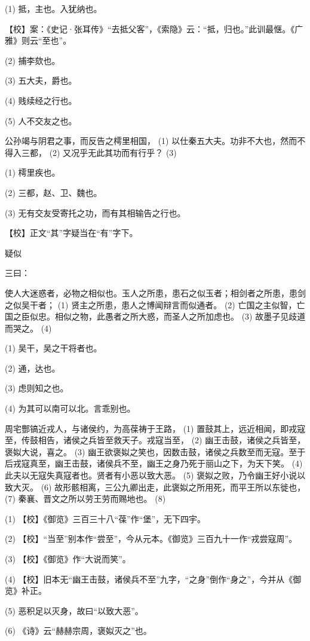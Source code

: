 \documentclass[12pt,UTF8]{ctexbook}
\begin{document}
(1) 抵，主也。入犹纳也。

【校】案：《史记·张耳传》“去抵父客”，《索隐》云：“抵，归也。”此训最惬。《广雅》则云“至也”。

(2) 捕李欬也。

(3) 五大夫，爵也。

(4) 贱续经之行也。

(5) 人不交友之也。

公孙竭与阴君之事，而反告之樗里相国， (1) 以仕秦五大夫。功非不大也，然而不得入三都， (2) 又况乎无此其功而有行乎？ (3)

(1) 樗里疾也。

(2) 三都，赵、卫、魏也。

(3) 无有交友受寄托之功，而有其相输告之行也。

【校】正文“其”字疑当在“有”字下。





疑似


三曰：

使人大迷惑者，必物之相似也。玉人之所患，患石之似玉者；相剑者之所患，患剑之似吴干者； (1) 贤主之所患，患人之博闻辩言而似通者。 (2) 亡国之主似智，亡国之臣似忠。相似之物，此愚者之所大惑，而圣人之所加虑也。 (3) 故墨子见歧道而哭之。 (4)

(1) 吴干，吴之干将者也。

(2) 通，达也。

(3) 虑则知之也。

(4) 为其可以南可以北。言乖别也。

周宅酆镐近戎人，与诸侯约，为高葆祷于王路， (1) 置鼓其上，远近相闻，即戎寇至，传鼓相告，诸侯之兵皆至救天子。戎寇当至， (2) 幽王击鼓，诸侯之兵皆至，褒姒大说，喜之。 (3) 幽王欲褒姒之笑也，因数击鼓，诸侯之兵数至而无寇。至于后戎寇真至，幽王击鼓，诸侯兵不至，幽王之身乃死于丽山之下，为天下笑。 (4) 此夫以无寇失真寇者也。贤者有小恶以致大恶。 (5) 褒姒之败，乃令幽王好小说以致大灭。 (6) 故形骸相离，三公九卿出走，此褒姒之所用死，而平王所以东徙也， (7) 秦襄、晋文之所以劳王劳而赐地也。 (8)

(1) 【校】《御览》三百三十八“葆”作“堡”，无下四宇。

(2) 【校】“当至”别本作“尝至”，今从元本。《御览》三百九十一作“戎尝寇周”。

(3) 【校】《御览》作“大说而笑”。

(4) 【校】旧本无“幽王击鼓，诸侯兵不至”九字，“之身”倒作“身之”，今并从《御览》补正。

(5) 恶积足以灭身，故曰“以致大恶”。

(6) 《诗》云“赫赫宗周，褒姒灭之”也。
\end{document}
